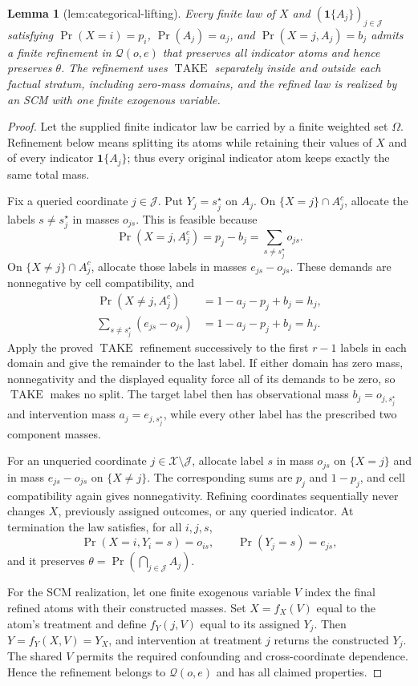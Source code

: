 \documentclass{article}
\newtheorem{lemma}{Lemma}
\begin{document}
\begin{lemma}[lem:categorical-lifting]\label{lem:categorical-lifting}
Every finite law of \(X\) and \((\mathbf 1\{A_j\})_{j\in\mathcal J}\) satisfying \(\Pr(X=i)=p_i\), \(\Pr(A_j)=a_j\), and \(\Pr(X=j,A_j)=b_j\) admits a finite refinement in \(\mathcal Q(o,e)\) that preserves all indicator atoms and hence preserves \(\theta\). The refinement uses \(\operatorname{TAKE}\) separately inside and outside each factual stratum, including zero-mass domains, and the refined law is realized by an SCM with one finite exogenous variable.
\end{lemma}
\begin{proof}
Let the supplied finite indicator law be carried by a finite weighted set \(\Omega\).  Refinement below means splitting its atoms while retaining their values of \(X\) and of every indicator \(\mathbf 1\{A_j\}\); thus every original indicator atom keeps exactly the same total mass.

Fix a queried coordinate \(j\in\mathcal J\).  Put \(Y_j=s_j^\star\) on \(A_j\).  On \(\{X=j\}\cap A_j^c\), allocate the labels \(s\ne s_j^\star\) in masses \(o_{js}\).  This is feasible because
\[
 \Pr(X=j,A_j^c)=p_j-b_j
 =\sum_{s\ne s_j^\star}o_{js}.
\]
On \(\{X\ne j\}\cap A_j^c\), allocate those labels in masses \(e_{js}-o_{js}\).  These demands are nonnegative by cell compatibility, and
\[
 \begin{aligned}
 \Pr(X\ne j,A_j^c)
 &=1-a_j-p_j+b_j=h_j,\\
 \sum_{s\ne s_j^\star}(e_{js}-o_{js})
 &=1-a_j-p_j+b_j=h_j.
 \end{aligned}
\]
Apply the proved \(\operatorname{TAKE}\) refinement successively to the first \(r-1\) labels in each domain and give the remainder to the last label.  If either domain has zero mass, nonnegativity and the displayed equality force all of its demands to be zero, so \(\operatorname{TAKE}\) makes no split.  The target label then has observational mass \(b_j=o_{j,s_j^\star}\) and intervention mass \(a_j=e_{j,s_j^\star}\), while every other label has the prescribed two component masses.

For an unqueried coordinate \(j\in\mathcal X\setminus\mathcal J\), allocate label \(s\) in mass \(o_{js}\) on \(\{X=j\}\) and in mass \(e_{js}-o_{js}\) on \(\{X\ne j\}\).  The corresponding sums are \(p_j\) and \(1-p_j\), and cell compatibility again gives nonnegativity.  Refining coordinates sequentially never changes \(X\), previously assigned outcomes, or any queried indicator.  At termination the law satisfies, for all \(i,j,s\),
\[
 \Pr(X=i,Y_i=s)=o_{is},\qquad \Pr(Y_j=s)=e_{js},
\]
and it preserves \(\theta=\Pr(\bigcap_{j\in\mathcal J}A_j)\).

For the SCM realization, let one finite exogenous variable \(V\) index the final refined atoms with their constructed masses.  Set \(X=f_X(V)\) equal to the atom's treatment and define \(f_Y(j,V)\) equal to its assigned \(Y_j\).  Then \(Y=f_Y(X,V)=Y_X\), and intervention at treatment \(j\) returns the constructed \(Y_j\).  The shared \(V\) permits the required confounding and cross-coordinate dependence.  Hence the refinement belongs to \(\mathcal Q(o,e)\) and has all claimed properties.
\end{proof}
\end{document}
